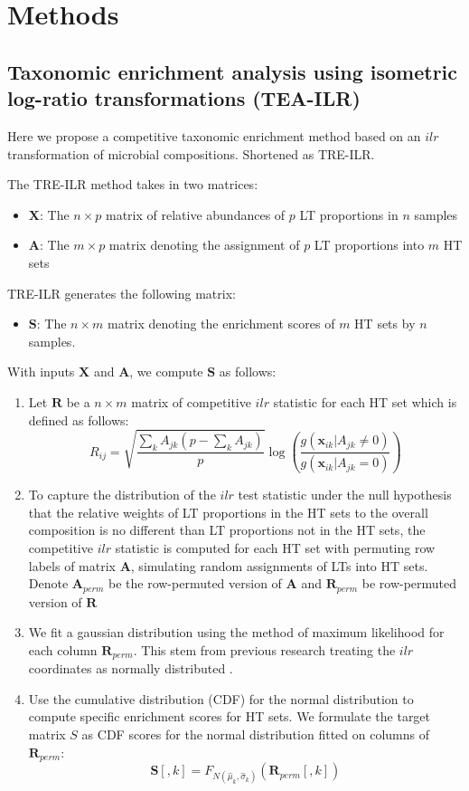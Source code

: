 \documentclass{article}
\begin{document}
\section{Methods}
\subsection{Taxonomic enrichment analysis using isometric log-ratio transformations (TEA-ILR)}
Here we propose a competitive taxonomic enrichment method based on an $ilr$ transformation of microbial compositions. Shortened as TRE-ILR.  
\vspace{3mm}

\noindent The TRE-ILR method takes in two matrices: 
\begin{itemize}
    \item $\bm X$: The $n \times p$ matrix of relative abundances of $p$ LT proportions in $n$ samples
    \item $\bm A$: The $m \times p$ matrix denoting the assignment of $p$ LT proportions into $m$ HT sets
\end{itemize}
TRE-ILR generates the following matrix: 
\begin{itemize}
    \item $\bm S$: The $n \times m$ matrix denoting the enrichment scores of $m$ HT sets by $n$ samples. 
\end{itemize}
With inputs $\bm{X}$ and $\bm{A}$, we compute $\bm{S}$ as follows:  
\begin{enumerate}
    \item Let $\bm{R}$ be a $n \times m$ matrix of competitive $ilr$ statistic for each HT set which is defined as follows:
    \begin{equation}
    R_{ij} = \sqrt{\frac{\sum_k A_{jk}(p - \sum_k A_{jk})}{p}} \log \left(\frac{g(\bm{x}_{ik} |A_{jk} \neq 0)}{g(\bm{x}_{ik} | A_{jk} = 0)}\right)
    \end{equation}
    \item To capture the distribution of the $ilr$ test statistic under the null hypothesis that the relative weights of LT proportions in the HT sets to the overall composition is no different than LT proportions not in the HT sets, the competitive $ilr$ statistic is computed for each HT set with permuting row labels of matrix $\bm{A}$, simulating random assignments of LTs into HT sets. Denote $\bm{A}_{perm}$ be the row-permuted version of $\bm{A}$ and $\bm{R}_{perm}$ be row-permuted version of $\bm{R}$
    \item We fit a gaussian distribution using the method of maximum likelihood for each column $\bm{R}_{perm}$. This stem from previous research treating the $ilr$ coordinates as normally distributed \cite{egozcue2005}.  
    \item Use the cumulative distribution (CDF) for the normal distribution to compute specific enrichment scores for HT sets. We formulate the target matrix $S$ as CDF scores for the normal distribution fitted on columns of $\bm{R}_{perm}$:
    \begin{equation}
        \bm{S}[,k] = F_{N(\hat{\mu}_{k},\hat{\sigma}_{k})}(\bm{R}_{perm}[,k])
    \end{equation}
\end{enumerate}
\end{document}
